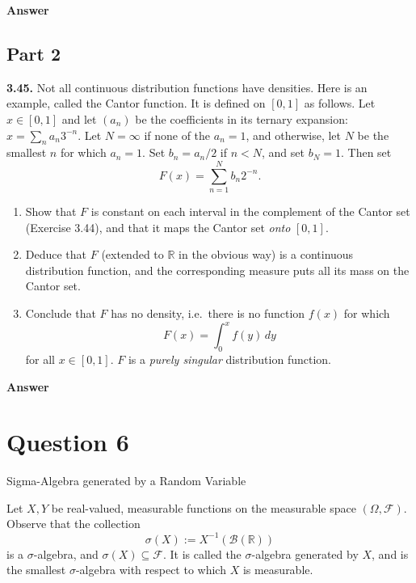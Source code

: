 \documentclass[letterpaper]{article}
\begin{document}
	\textbf{Answer}
	
	\clearpage
		
		\subsection{Part 2}
		\textbf{3.45.} Not all continuous distribution functions have densities. Here is an example,
		called the Cantor function. It is defined on $[0,1]$ as follows. Let $x \in [0,1]$
		and let $(a_n)$ be the coefficients in its ternary expansion:
		$x = \sum_n a_n 3^{-n}$. Let $N = \infty$ if none of the $a_n = 1$, and otherwise,
		let $N$ be the smallest $n$ for which $a_n = 1$. Set $b_n = a_n/2$ if $n < N$,
		and set $b_N = 1$. Then set
		\[
		F(x) = \sum_{n=1}^{N} b_n 2^{-n}.
		\]
		
		\begin{enumerate}
			\item[(a)] Show that $F$ is constant on each interval in the complement of the Cantor
			set (Exercise 3.44), and that it maps the Cantor set \emph{onto} $[0,1]$.
			
			\item[(b)] Deduce that $F$ (extended to $\mathbb{R}$ in the obvious way) is a continuous
			distribution function, and the corresponding measure puts all its mass on
			the Cantor set.
			
			\item[(c)] Conclude that $F$ has no density, i.e.\ there is no function $f(x)$ for which
			\[
			F(x) = \int_0^x f(y)\,dy
			\]
			for all $x \in [0,1]$. $F$ is a \emph{purely singular} distribution function.
		\end{enumerate}
		
		\textbf{Answer}
		
		\clearpage
		
		\section{Question 6}
		
		{\color{deepred}Sigma-Algebra generated by a Random Variable}
		
		Let $X,Y$ be real-valued, measurable functions on the measurable space
		$(\Omega,\mathcal{F})$. Observe that the collection
		\[
		\sigma(X) := X^{-1}(\mathcal{B}(\mathbb{R}))
		\]
		is a $\sigma$-algebra, and $\sigma(X)\subseteq \mathcal{F}$. It is called the
		$\sigma$-algebra generated by $X$, and is the smallest $\sigma$-algebra with
		respect to which $X$ is measurable.
		
\end{document}
